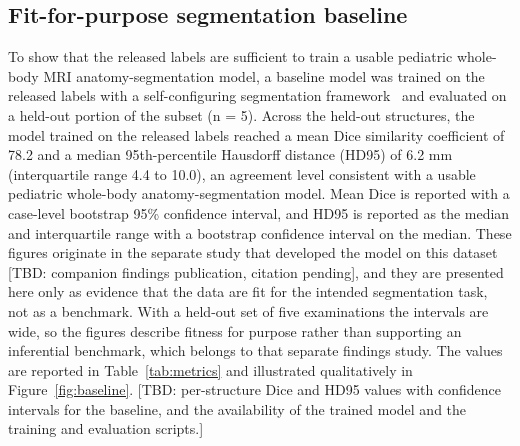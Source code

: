 \subsection*{Fit-for-purpose segmentation baseline}\label{subsec:baseline}
To show that the released labels are sufficient to train a usable pediatric whole-body MRI anatomy-segmentation model, a baseline model was trained on the released labels with a self-configuring segmentation framework~\cite{Isensee_2021} and evaluated on a held-out portion of the subset (n = 5).
Across the held-out structures, the model trained on the released labels reached a mean Dice similarity coefficient of 78.2 and a median 95th-percentile Hausdorff distance (HD95) of 6.2 mm (interquartile range 4.4 to 10.0), an agreement level consistent with a usable pediatric whole-body anatomy-segmentation model.
Mean Dice is reported with a case-level bootstrap 95\% confidence interval, and HD95 is reported as the median and interquartile range with a bootstrap confidence interval on the median.
These figures originate in the separate study that developed the model on this dataset [TBD: companion findings publication, citation pending], and they are presented here only as evidence that the data are fit for the intended segmentation task, not as a benchmark.
With a held-out set of five examinations the intervals are wide, so the figures describe fitness for purpose rather than supporting an inferential benchmark, which belongs to that separate findings study.
The values are reported in Table~\ref{tab:metrics} and illustrated qualitatively in Figure~\ref{fig:baseline}.
[TBD: per-structure Dice and HD95 values with confidence intervals for the baseline, and the availability of the trained model and the training and evaluation scripts.]

